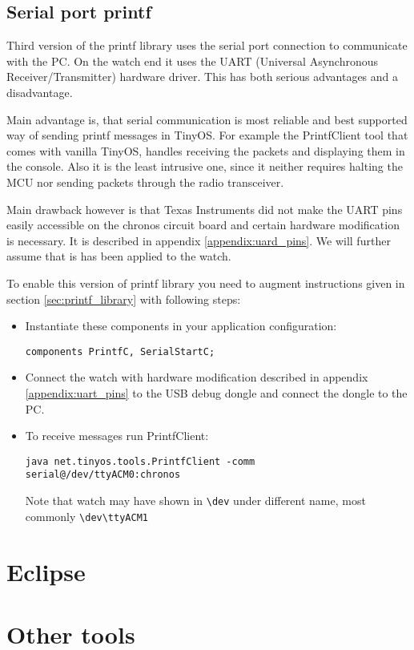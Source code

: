 \subsection{Serial port printf}
Third version of the printf library uses the serial port connection to
communicate with the PC. On the watch end it uses the UART (Universal
Asynchronous Receiver/Transmitter) hardware driver. This has both
serious advantages and a disadvantage.

Main advantage is, that serial communication is most reliable and best
supported way of sending printf messages in TinyOS. For example the
PrintfClient tool that comes with vanilla TinyOS, handles receiving
the packets and displaying them in the console. Also it is the least
intrusive one, since it neither requires halting the MCU nor sending
packets through the radio transceiver.

Main drawback however is that Texas Instruments did not make the UART
pins easily accessible on the chronos circuit board and certain
hardware modification is necessary.  It is described in appendix
\ref{appendix:uard_pins}. We will further assume that is has been
applied to the watch.

To enable this version of printf library you need to augment
instructions given in section \ref{sec:printf_library} with following
steps:

\begin{itemize}
  \item Instantiate these components in your application configuration:

  \texttt{components PrintfC, SerialStartC;}

  \item Connect the watch with hardware modification described in
    appendix \ref{appendix:uart_pins} to the USB debug dongle and
    connect the dongle to the PC.

  \item To receive messages run PrintfClient:

  \texttt{java net.tinyos.tools.PrintfClient -comm serial@/dev/ttyACM0:chronos}

  Note that watch may have shown in \texttt{\textbackslash dev} under
  different name, most commonly
  \texttt{\textbackslash dev\textbackslash ttyACM1}
\end{itemize}



 

\section{Eclipse}


\section{Other tools}



